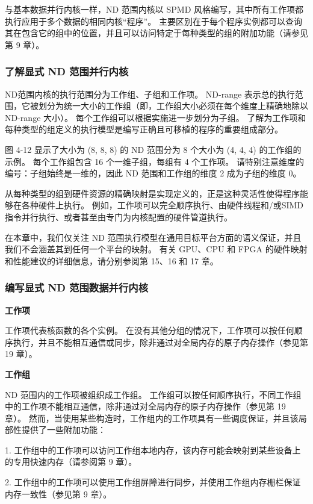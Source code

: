 与基本数据并行内核一样，ND 范围内核以 SPMD 风格编写，其中所有工作项都执行应用于多个数据的相同内核“程序”。 主要区别在于每个程序实例都可以查询其在包含它的组中的位置，并且可以访问特定于每种类型的组的附加功能（请参见第 9 章）。

\subsubsection{了解显式 ND 范围并行内核}
ND范围内核的执行范围分为工作组、子组和工作项。 ND-range 表示总的执行范围，它被划分为统一大小的工作组（即，工作组大小必须在每个维度上精确地除以 ND-range 大小）。 每个工作组可以根据实施进一步划分为子组。 了解为工作项和每种类型的组定义的执行模型是编写正确且可移植的程序的重要组成部分。

图 4-12 显示了大小为 (8, 8, 8) 的 ND 范围分为 8 个大小为 (4, 4, 4) 的工作组的示例。 每个工作组包含 16 个一维子组，每组有 4 个工作项。 请特别注意维度的编号：子组始终是一维的，因此 ND 范围和工作组的维度 2 成为子组的维度 0。

从每种类型的组到硬件资源的精确映射是实现定义的，正是这种灵活性使得程序能够在各种硬件上执行。 例如，工作项可以完全顺序执行、由硬件线程和/或SIMD指令并行执行、或者甚至由专门为内核配置的硬件管道执行。

在本章中，我们仅关注 ND 范围执行模型在通用目标平台方面的语义保证，并且我们不会涵盖其到任何一个平台的映射。 有关 GPU、CPU 和 FPGA 的硬件映射和性能建议的详细信息，请分别参阅第 15、16 和 17 章。

\subsubsection{编写显式 ND 范围数据并行内核}
\textbf{工作项}

工作项代表核函数的各个实例。 在没有其他分组的情况下，工作项可以按任何顺序执行，并且不能相互通信或同步，除非通过对全局内存的原子内存操作（参见第 19 章）。

\textbf{工作组}

ND 范围内的工作项被组织成工作组。 工作组可以按任何顺序执行，不同工作组中的工作项不能相互通信，除非通过对全局内存的原子内存操作（参见第 19 章）。 然而，当使用某些构造时，工作组内的工作项具有一些调度保证，并且该局部性提供了一些附加功能：

1. 工作组中的工作项可以访问工作组本地内存，该内存可能会映射到某些设备上的专用快速内存（请参阅第 9 章）。

2. 工作组中的工作项可以使用工作组屏障进行同步，并使用工作组内存栅栏保证内存一致性（参见第 9 章）。

